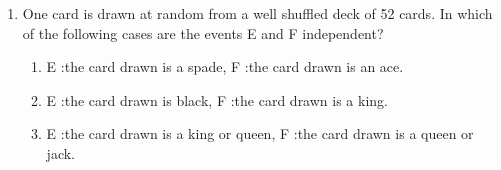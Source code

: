 \renewcommand{\theequation}{\theenumi}
\begin{enumerate}[label=\thesection.\arabic*.,ref=\thesection.\theenumi]
\item One card is drawn at random from a well shuffled deck of 52 cards. In which of the following cases are the events E and F independent?
\begin{enumerate}
\item E :the card drawn is a spade, F :the card drawn is an ace.
\item E :the card drawn is black, F :the card drawn is a king.
\item E :the card drawn is a king or queen, F :the card drawn is a queen or jack.
\end{enumerate}

\end{enumerate}